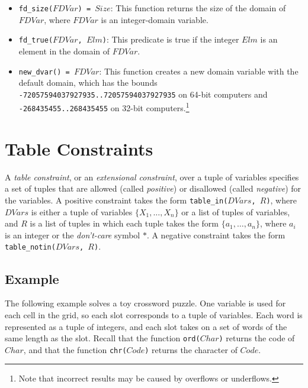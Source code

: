 \begin{itemize}
an interval representation into a bit-vector representation, no matter how big the domain is. This built-in is only provided by {\tt cp}.
\item \texttt{fd\_size($FDVar$) = $Size$}: This function returns the size of the domain of $FDVar$,  where $FDVar$ is an integer-domain variable.
\item \texttt{fd\_true($FDVar$, $Elm$)}: This predicate is true if the integer $Elm$ is an element in the domain of $FDVar$.
\item \texttt{new\_dvar() = $FDVar$}: This function creates a new domain variable with the default domain, which has the bounds \texttt{-72057594037927935..72057594037927935} on 64-bit computers and \texttt{-268435455..268435455} on 32-bit computers.\footnote{Note that incorrect results may be caused by overflows or underflows.}
\end{itemize}

\section{Table Constraints}
A \emph{table constraint}, or an \emph{extensional constraint}, over a tuple of variables specifies a set of tuples that are allowed (called \emph{positive}) or disallowed (called \emph{negative}) for the variables. A positive constraint takes the form \texttt{table\_in($DVars$, $R$)}, where $DVars$ is either a tuple of variables $\{X_1,\ldots,X_n\}$ or a list of tuples of variables, and $R$ is a list of tuples in which each tuple takes the form $\{a_1,\ldots,a_n\}$, where $a_i$ is an integer or the \textit{don't-care} symbol $*$.  A negative constraint takes the form \texttt{table\_notin($DVars$, $R$)}.

\subsection*{Example}
The following example solves a toy crossword puzzle. One variable is used for each cell in the grid, so each slot corresponds to a tuple of variables. Each word is represented as a tuple of integers, and each slot takes on a set of words of the same length as the slot. Recall that the function \texttt{ord($Char$)} returns the code of $Char$, and that the function \texttt{chr($Code$)} returns the character of $Code$.

